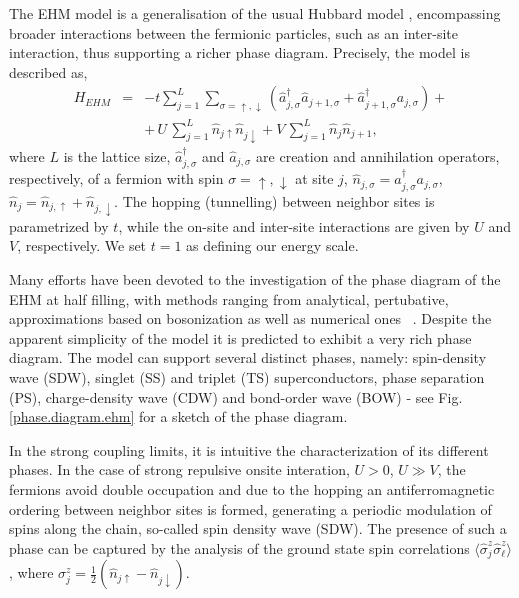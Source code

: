 \documentclass[prb,reprint,showpacs,twocolumn,superscriptaddress]{revtex4-2}
\newcommand{\ad}[1]{\hat a^{\dagger}_{#1}}
\begin{document}
The EHM model is a generalisation of the usual Hubbard model \cite{hubbard63, solymon}, 
encompassing broader interactions between the
fermionic particles, such as an inter-site interaction,
thus supporting a richer phase diagram. Precisely, the model is described as,
\begin{eqnarray}
H_{EHM}&=&-t\sum\limits_{j=1}^{L}\sum\limits_{\sigma = \uparrow, \downarrow}
(\ad{j,\sigma}\hat a_{j+1,\sigma} + \ad{j+1,\sigma}a_{j,\sigma}) +\nonumber \\
& & +\, U\, \sum_{j=1}^{L}\hat{n}_{j\uparrow}\hat{n}_{j\downarrow}
 + V\, \sum_{j=1}^{L}\hat{n}_{j}\hat{n}_{j+1},
\label{ehm}
\end{eqnarray}
where $L $ is the lattice size, $\ad{j,\sigma}$ and $\hat a_{j,\sigma}$ are
creation and annihilation operators, respectively, of a fermion with spin
$\sigma = \uparrow, \downarrow$ at  site $j$,
$\hat{n}_{j,\sigma} = \ad{j,\sigma}a_{j,\sigma}$, $\hat{n}_{j}
= \hat{n}_{j,\uparrow} + \hat{n}_{j,\downarrow}$. 
The hopping (tunnelling) between neighbor sites is parametrized by $t$,
while the on-site and inter-site interactions are given by $U$ and $V$, respectively.
We set $t = 1$ as defining our energy scale.
 
Many efforts have been devoted to the investigation of the phase diagram of the EHM at half filling, 
with methods ranging from analytical, pertubative, approximations based on bosonization as well as 
numerical ones~ \cite{lin00,nakamura00,sengupta02,zhang04,dalmonte14,jeckelmann02,Kancharla2001,ejima07,sandvik04,Shinjo2019,Kazuya2020,DaiWei2021}.
Despite the apparent simplicity  of the model it is predicted to exhibit a very rich phase diagram. 
The model can support several distinct phases, namely: spin-density wave (SDW), singlet (SS) and 
triplet (TS) superconductors, phase separation (PS), charge-density wave (CDW) and bond-order wave 
(BOW) - see Fig.\eqref{phase.diagram.ehm} for a sketch of the phase diagram.

In the strong coupling limits, it is intuitive the characterization of its different phases. In the case of strong repulsive onsite interation, $U>0$, $U \gg V$, the fermions avoid double 
occupation and due to the hopping an antiferromagnetic ordering between neighbor sites is formed, 
generating a periodic modulation of spins along the chain, so-called spin density wave (SDW).
The presence of such a phase can be captured by the analysis of the ground state spin correlations 
$\langle \hat \sigma^z_j \hat \sigma^z_\ell\rangle$,
where $\sigma_j^z = \frac{1}{2}(\hat{n}_{j \uparrow}-\hat{n}_{j \downarrow})$.
\end{document}
